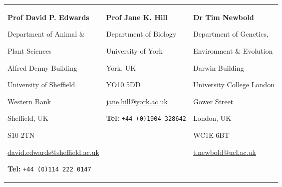 

\setlength{\tabcolsep}{0.5em} %
\begin{tabular}{ p{5.6cm} p{4.6cm} p{4.6cm}}
\textbf{Prof David P. Edwards}\par
Department of Animal \& 
    \par \hspace{0.5em} Plant Sciences\par 
Alfred Denny Building\par 
University of Sheffield\par
Western Bank \par
Sheffield, UK\par
S10 2TN\par
\url{david.edwards@sheffield.ac.uk}\par
\textbf{Tel:} {\texttt{+44 (0)114 222 0147}}
& 
\textbf{Prof Jane K. Hill}\par
Department of Biology\par
University of York\par
York, UK\par
YO10 5DD\par
\url{jane.hill@york.ac.uk}\par
\textbf{Tel:} {\texttt{+44 (0)1904 328642}}
& 
\textbf{Dr Tim Newbold}\par
Department of Genetics, 
    \par \hspace{0.5em}Environment \& Evolution\par
Darwin Building\par
University College London\par
Gower Street\par
London, UK\par
WC1E 6BT\par
\url{t.newbold@ucl.ac.uk}\par
\\
\end{tabular}
